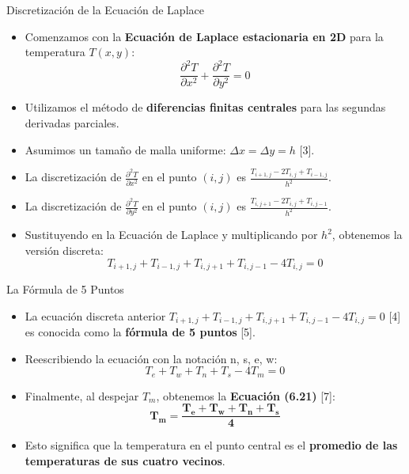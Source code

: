 \documentclass{beamer}
\begin{document}
  \begin{frame}{Discretización de la Ecuación de Laplace}
  \begin{itemize}
          \small
    \item Comenzamos con la \textbf{Ecuación de Laplace estacionaria en 2D} para la temperatura \( T(x,y) \):
    $$ \frac{\partial^2 T}{\partial x^2} + \frac{\partial^2 T}{\partial y^2}=0 $$ 

\item Utilizamos el método de \textbf{diferencias finitas centrales} para las segundas derivadas parciales.
    \item Asumimos un tamaño de malla uniforme: \( \Delta x = \Delta y = h \) [3].
    \item La discretización de \( \frac{\partial^2 T}{\partial x^2} \) en el punto \((i,j)\) es \( \frac{T_{i+1,j}-2T_{i,j}+T_{i-1,j}}{h^2} \).
    \item La discretización de \( \frac{\partial^2 T}{\partial y^2} \) en el punto \((i,j)\) es \( \frac{T_{i,j+1}-2T_{i,j}+T_{i,j-1}}{h^2} \).
    \item Sustituyendo en la Ecuación de Laplace y multiplicando por \( h^2 \), obtenemos la versión discreta:
    $$ T_{i+1,j}+T_{i-1,j}+T_{i,j+1}+T_{i,j-1}-4 T_{i,j}=0 $$
  \end{itemize}
\end{frame}

\begin{frame}{La Fórmula de 5 Puntos}
  \begin{itemize}
          \small
    \item La ecuación discreta anterior \( T_{i+1,j}+T_{i-1,j}+T_{i,j+1}+T_{i,j-1}-4 T_{i,j}=0 \) [4] es conocida como la \textbf{fórmula de 5 puntos} [5].


    \item Reescribiendo la ecuación con la notación n, s, e, w:
    $$ T_{e}+T_{w}+T_{n}+T_{s}-4 T_{m}=0 $$ 

    \item Finalmente, al despejar \( T_m \), obtenemos la \textbf{Ecuación (6.21)} [7]:
    $$ \mathbf{T_{m}= \frac{T_{e}+T_{w}+T_{n}+T_{s}}{4}} $$ 

    \item Esto significa que la temperatura en el punto central es el \textbf{promedio de las temperaturas de sus cuatro vecinos}.
  \end{itemize}
\end{frame}
\end{document}
